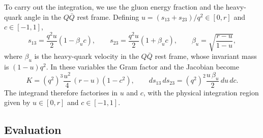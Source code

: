 To carry out the integration, we use the gluon energy fraction and the heavy-quark angle in the
$Q\bar Q$ rest frame. Defining
$u=(s_{13}+s_{23})/q^2\in[0,r]$ and $c\in[-1,1]$,
\begin{equation}
    s_{13} = \frac{q^2u}{2}\left(1-\beta_u c\right),\qquad
    s_{23} = \frac{q^2u}{2}\left(1+\beta_u c\right),\qquad
    \beta_u = \sqrt{\frac{r-u}{1-u}},
\end{equation}
where $\beta_u$ is the heavy-quark velocity in the $Q\bar Q$ rest frame, whose invariant mass is
$(1-u)q^2$. In these variables the Gram factor and the Jacobian become
\begin{equation}
    K = \left(q^2\right)^3\frac{u^2}{4}\,(r-u)\left(1-c^2\right),\qquad
    ds_{13}\,ds_{23} = \left(q^2\right)^2\frac{u\,\beta_u}{2}\,du\,dc.
\end{equation}
The integrand therefore factorises in $u$ and $c$, with the physical integration region given by
$u\in[0,r]$ and $c\in[-1,1]$.

\subsection{Evaluation}

